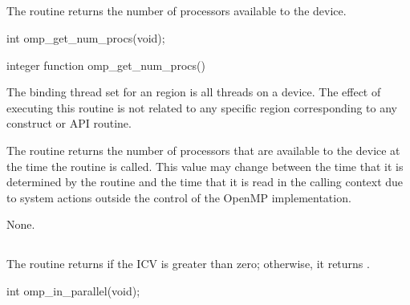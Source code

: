 \subsection{}
\label{subsec:omp_get_num_procs}
\summary
The  routine returns the number of processors available to the 
device.

\format
\begin{ccppspecific}
\begin{boxedcode}
int omp\_get\_num\_procs(void);
\end{boxedcode}
\end{ccppspecific}

\begin{fortranspecific}
\begin{boxedcode}
integer function omp\_get\_num\_procs()
\end{boxedcode}
\end{fortranspecific}

\binding
The binding thread set for an  region is all threads on a device. 
The effect of executing this routine is not related to any specific region corresponding to 
any construct or API routine.

\effect
The  routine returns the number of processors that are available 
to the device at the time the routine is called. This value may change between 
the time that it is determined by the  routine and the time that it 
is read in the calling context due to system actions outside the control of the OpenMP 
implementation.

\crossreferences
None.







\subsection{}
\label{subsec:omp_in_parallel}
\summary
The  routine returns  if the  ICV is greater 
than zero; otherwise, it returns .

\pagebreak
\format
\begin{ccppspecific}
\begin{boxedcode}
int omp\_in\_parallel(void);
\end{boxedcode}
\end{ccppspecific}

